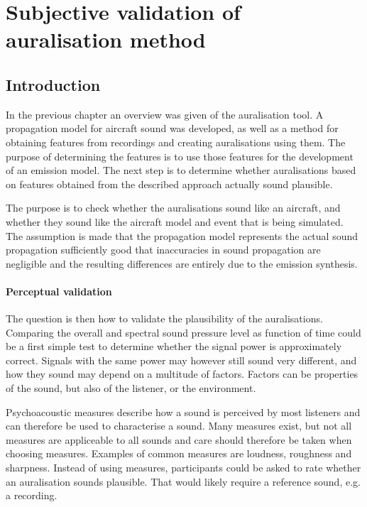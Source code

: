 \chapter{Subjective validation of auralisation method}\label{chapter:test}

\section{Introduction}
In the previous chapter an overview was given of the auralisation tool. A
propagation model for aircraft sound was developed, as well as a method for
obtaining features from recordings and creating auralisations using them. The
purpose of determining the features is to use those features for the development
of an emission model.  The next step is to determine whether auralisations based
on features obtained from the described approach actually sound plausible.

The purpose is to check whether the auralisations sound like an aircraft, and
whether they sound like the aircraft model and event that is being simulated.
The assumption is made that the propagation model represents the actual sound
propagation sufficiently good that inaccuracies in sound propagation are
negligible and the resulting differences are entirely due to the emission
synthesis.

\subsubsection*{Perceptual validation}
The question is then how to validate the plausibility of the auralisations.
Comparing the overall and spectral sound pressure level as function of time
could be a first simple test to determine whether the signal power is approximately
correct. Signals with the same power may however still sound very different,
and how they sound may depend on a multitude of factors. Factors can be properties
of the sound, but also of the listener, or the environment.

Psychoacoustic measures describe how a sound is perceived by most listeners and
can therefore be used to characterise a sound. Many measures exist, but not all
measures are appliceable to all sounds and care should therefore be taken when
choosing measures. Examples of common measures are loudness, roughness and
sharpness. Instead of using measures, participants could be asked to rate
whether an auralisation sounds plausible. That would likely require a reference
sound, e.g. a recording.

